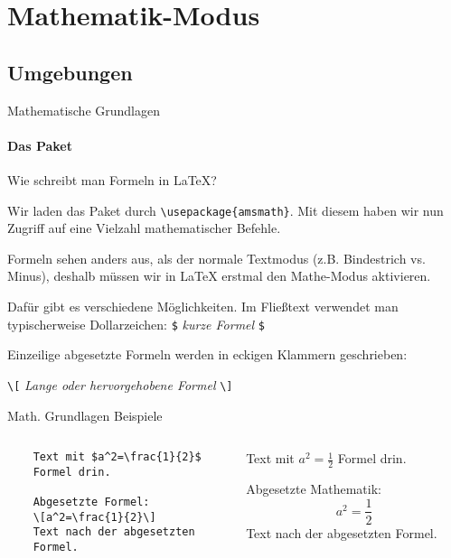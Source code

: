 \section{Mathematik-Modus}
\subsection{Umgebungen}
\begin{frame}[fragile]{Mathematische Grundlagen}
\framesubtitle{Das Paket }
Wie schreibt man Formeln in \LaTeX{}?

\medskip\pause
Wir laden das Paket  durch \verb+\usepackage{amsmath}+. Mit diesem haben wir nun Zugriff auf eine Vielzahl mathematischer Befehle.

\medskip\pause
Formeln sehen anders aus, als der normale Textmodus (z.B. Bindestrich vs. Minus), deshalb müssen wir in \LaTeX{} erstmal den Mathe-Modus aktivieren.

\medskip\pause
Dafür gibt es verschiedene Möglichkeiten. Im Fließtext verwendet man typischerweise Dollarzeichen: \texttt{\$} \emph{kurze Formel} \texttt{\$}

Einzeilige abgesetzte Formeln werden in eckigen Klammern geschrieben: 
\begin{center}
\texttt{\textbackslash[} \emph{Lange oder hervorgehobene Formel} \texttt{\textbackslash]}
\end{center}
\end{frame}

\begin{frame}[fragile]{Math. Grundlagen Beispiele}
\begin{columns}
\begin{column}{.48\textwidth}\footnotesize
\begin{codeblock}
\begin{verbatim}
	Text mit $a^2=\frac{1}{2}$
	Formel drin.

	Abgesetzte Formel:
	\[a^2=\frac{1}{2}\]
	Text nach der abgesetzten
	Formel.
\end{verbatim}
\end{codeblock}
\end{column}
%
\begin{column}{.45\textwidth}	\pause	
	Text mit $a^2=\frac{1}{2}$ Formel drin.
    
    \pause
	Abgesetzte Mathematik:
	\[a^2=\frac{1}{2}\]
	Text nach der abgesetzten Formel.
\end{column}
\end{columns}
\end{frame}





